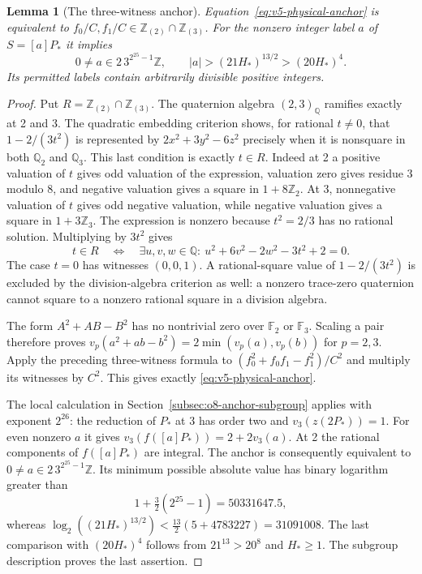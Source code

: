 \documentclass[11pt]{article}
\newtheorem{lemma}[theorem]{Lemma}
\theoremstyle{definition}
\theoremstyle{remark}
\newcommand{\Q}{\mathbb Q}
\newcommand{\Z}{\mathbb Z}
\newcommand{\F}{\mathbb F}
\begin{document}
\begin{lemma}[The three-witness anchor]\label{lem:v5-three-witness-anchor}
Equation~\eqref{eq:v5-physical-anchor} is equivalent to
$f_0/C,f_1/C\in\Z_{(2)}\cap\Z_{(3)}$. For the nonzero integer label
$a$ of $S=[a]P_*$ it implies
\[
 0\ne a\in2\,3^{2^{25}-1}\Z,\qquad
 |a|>(21H_*)^{13/2}>(20H_*)^4.
\]
Its permitted labels contain arbitrarily divisible positive integers.
\end{lemma}
\begin{proof}
Put $R=\Z_{(2)}\cap\Z_{(3)}$. The quaternion algebra $(2,3)_\Q$
ramifies exactly at 2 and 3. The quadratic embedding criterion
\cite[Proposition 14.6.7]{voight2021} shows, for rational $t\ne0$,
that $1-2/(3t^2)$ is represented by $2x^2+3y^2-6z^2$ precisely
when it is nonsquare in both $\Q_2$ and $\Q_3$. This last condition
is exactly $t\in R$. Indeed at 2 a positive valuation of $t$ gives
odd valuation of the expression, valuation zero gives residue 3
modulo 8, and negative valuation gives a square in $1+8\Z_2$.
At 3, nonnegative valuation of $t$ gives odd negative valuation,
while negative valuation gives a square in $1+3\Z_3$.
The expression is nonzero because $t^2=2/3$ has no rational solution.
Multiplying by $3t^2$ gives
\[
 t\in R\quad\Longleftrightarrow\quad
 \exists u,v,w\in\Q:\ u^2+6v^2-2w^2-3t^2+2=0.
\]
The case $t=0$ has witnesses $(0,0,1)$. A rational-square value of
$1-2/(3t^2)$ is excluded by the division-algebra criterion as well:
a nonzero trace-zero quaternion cannot square to a nonzero rational
square in a division algebra.

The form $A^2+AB-B^2$ has no nontrivial zero over $\F_2$ or $\F_3$.
Scaling a pair therefore proves
$v_p(a^2+ab-b^2)=2\min(v_p(a),v_p(b))$ for $p=2,3$.
Apply the preceding three-witness formula to
$(f_0^2+f_0f_1-f_1^2)/C^2$ and multiply its witnesses by $C^2$.
This gives exactly \eqref{eq:v5-physical-anchor}.

The local calculation in Section~\ref{subsec:o8-anchor-subgroup}
applies with exponent $2^{26}$: the reduction of $P_*$ at 3 has
order two and $v_3(z(2P_*))=1$. For even nonzero $a$ it gives
$v_3(f([a]P_*))=2+2v_3(a)$. At 2 the rational components of
$f([a]P_*)$ are integral. The anchor is consequently equivalent to
$0\ne a\in2\,3^{2^{25}-1}\Z$. Its minimum possible absolute value
has binary logarithm greater than
\[
 1+\tfrac32(2^{25}-1)=50331647.5,
\]
whereas
$\log_2((21H_*)^{13/2})<\tfrac{13}{2}(5+4783227)=31091008$.
The last comparison with $(20H_*)^4$ follows from
$21^{13}>20^8$ and $H_*\ge1$. The subgroup description proves the
last assertion.
\end{proof}
\end{document}
